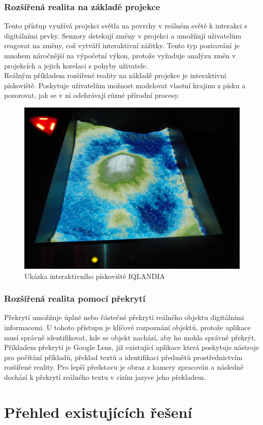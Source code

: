 \pagebreak
\subsubsection{Rozšířená realita na základě projekce}
Tento přístup využívá projekci světla na povrchy v reálném světě k interakci s digitálními prvky. Senzory detekují změny v projekci a umožňují uživatelům reagovat na změny, což vytváří interaktivní zážitky. Tento typ pozicování je mnohem náročnější na výpočetní výkon, protože vyžaduje analýzu změn v projekcích a jejich korelaci s pohyby uživatele. \cite{AROverview} \\
Reálným příkladem rozšířené reality na základě projekce je interaktivní pískoviště. Poskytuje uživatelům možnost modelovat vlastní krajinu z písku a pozorovat, jak se v ní odehrávají různé přírodní procesy. \cite{IQLANDIAGeo} \\
\begin{figure}[h]
    \centering
    \includegraphics[scale=0.13]{images/IQLANDIA}
    \caption{Ukázka interaktivního pískoviště IQLANDIA}
    \label{fig:iqlandia}
\end{figure}

\subsubsection{Rozšířená realita pomocí překrytí}
Překrytí umožňuje úplné nebo částečné překrytí reálného objektu digitálními informacemi. U tohoto přístupu je klíčové rozpoznání objektů, protože aplikace musí správně identifikovat, kde se objekt nachází, aby ho mohla správně překrýt. \cite{AROverview} \\
Příkladem překrytí je Google Lens, již existující aplikace která poskytuje nástroje pro počítání příkladů, překlad textů a identifikaci předmětů prostřednictvím rozšířené reality. Pro lepší představu je obraz z kamery zpracován a následně dochází k překrytí reálného textu v cizím jazyce jeho překladem. \cite{googlelens}
\section{Přehled existujících řešení}